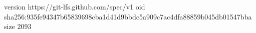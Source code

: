 version https://git-lfs.github.com/spec/v1
oid sha256:935fe94347b65839698cba1d41d9bbdc5a909c7ac4dfa88859b045db01547bba
size 2093
